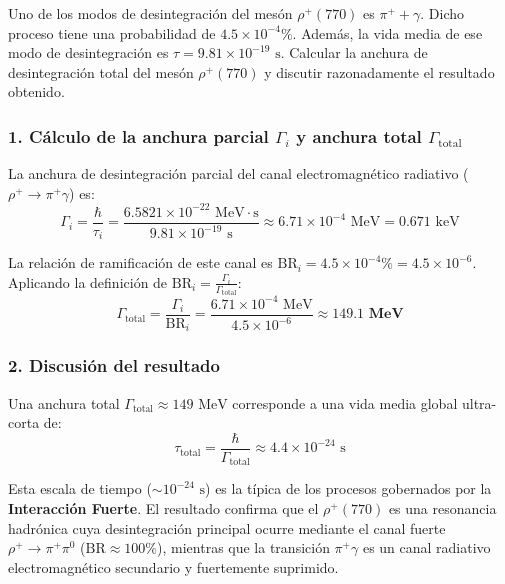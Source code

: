 \begin{problema}
Uno de los modos de desintegración del mesón $\rho^+(770)$ es $\pi^+ + \gamma$. Dicho proceso tiene una probabilidad de $4.5 \times 10^{-4}\%$. Además, la vida media de ese modo de desintegración es $\tau = 9.81 \times 10^{-19}\text{ s}$. Calcular la anchura de desintegración total del mesón $\rho^+(770)$ y discutir razonadamente el resultado obtenido.

\tcblower

\subsubsection*{1. Cálculo de la anchura parcial $\Gamma_i$ y anchura total $\Gamma_{\text{total}}$}

La anchura de desintegración parcial del canal electromagnético radiativo ($\rho^+ \to \pi^+ \gamma$) es:
\begin{equation*}
\Gamma_i = \frac{\hbar}{\tau_i} = \frac{6.5821 \times 10^{-22}\text{ MeV}\cdot\text{s}}{9.81 \times 10^{-19}\text{ s}} \approx 6.71 \times 10^{-4}\text{ MeV} = 0.671\text{ keV}
\end{equation*}

La relación de ramificación de este canal es $\text{BR}_i = 4.5 \times 10^{-4}\% = 4.5 \times 10^{-6}$. Aplicando la definición de $\text{BR}_i = \frac{\Gamma_i}{\Gamma_{\text{total}}}$:
\begin{equation*}
\Gamma_{\text{total}} = \frac{\Gamma_i}{\text{BR}_i} = \frac{6.71 \times 10^{-4}\text{ MeV}}{4.5 \times 10^{-6}} \approx \mathbf{149.1\text{ MeV}}
\end{equation*}

\subsubsection*{2. Discusión del resultado}

Una anchura total $\Gamma_{\text{total}} \approx 149\text{ MeV}$ corresponde a una vida media global ultra-corta de:
\begin{equation*}
\tau_{\text{total}} = \frac{\hbar}{\Gamma_{\text{total}}} \approx 4.4 \times 10^{-24}\text{ s}
\end{equation*}

Esta escala de tiempo ($\sim 10^{-24}\text{ s}$) es la típica de los procesos gobernados por la \textbf{Interacción Fuerte}. El resultado confirma que el $\rho^+(770)$ es una resonancia hadrónica cuya desintegración principal ocurre mediante el canal fuerte $\rho^+ \to \pi^+ \pi^0$ ($\text{BR} \approx 100\%$), mientras que la transición $\pi^+ \gamma$ es un canal radiativo electromagnético secundario y fuertemente suprimido.
\end{problema}


